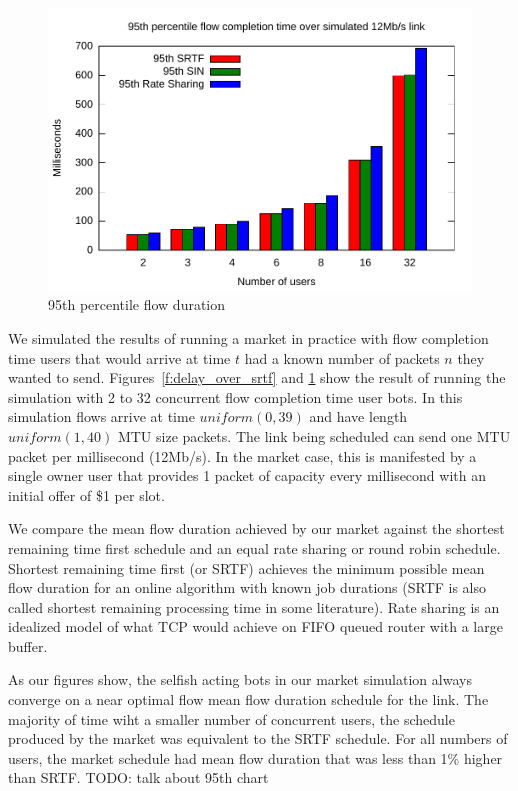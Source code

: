 \begin{figure}
\includegraphics[width=\columnwidth]{plots/95th_delay_over_srtf.pdf}
\caption{95th percentile flow duration}
\label{f:95th_delay_over_srtf}
\end{figure}

We simulated the results of running a market in practice with flow completion time users that would arrive at time $t$ had a known number of packets $n$ they wanted to send.
Figures~\ref{f:delay_over_srtf} and \ref{f:95th_delay_over_srtf} show the result of running the simulation with 2 to 32 concurrent flow completion time user bots. In this simulation flows arrive at time $uniform(0, 39)$ and have length $uniform(1, 40)$ MTU size packets.
The link being scheduled can send one MTU packet per millisecond (12Mb/s). In the market case, this is manifested by a single owner user that provides 1 packet of capacity every millisecond with an initial offer of \$1 per slot.

We compare the mean flow duration achieved by our market against the shortest remaining time first schedule and an equal rate sharing or round robin schedule. Shortest remaining time first (or SRTF) achieves the minimum possible mean flow duration for an online algorithm with known job durations\cite{karger10,bansal01} (SRTF is also called shortest remaining processing time in some literature).
Rate sharing is an idealized model of what TCP would achieve on FIFO queued router with a large buffer.

As our figures show, the selfish acting bots in our market simulation always converge on a near optimal flow mean flow duration schedule for the link. The majority of time wiht a smaller number of concurrent users, the schedule produced by the market was equivalent to the SRTF schedule. For all numbers of users, the market schedule had mean flow duration that was less than 1\% higher than SRTF.
TODO: talk about 95th chart

